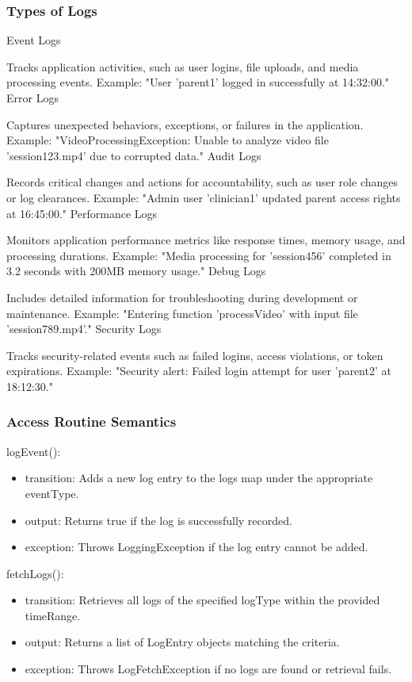 \documentclass[12pt, titlepage]{article}
\begin{document}
\subsubsection{Types of Logs}

Event Logs

Tracks application activities, such as user logins, file uploads, and media processing events.
Example: "User 'parent1' logged in successfully at 14:32:00."
Error Logs

Captures unexpected behaviors, exceptions, or failures in the application.
Example: "VideoProcessingException: Unable to analyze video file 'session123.mp4' due to corrupted data."
Audit Logs

Records critical changes and actions for accountability, such as user role changes or log clearances.
Example: "Admin user 'clinician1' updated parent access rights at 16:45:00."
Performance Logs

Monitors application performance metrics like response times, memory usage, and processing durations.
Example: "Media processing for 'session456' completed in 3.2 seconds with 200MB memory usage."
Debug Logs

Includes detailed information for troubleshooting during development or maintenance.
Example: "Entering function 'processVideo' with input file 'session789.mp4'."
Security Logs

Tracks security-related events such as failed logins, access violations, or token expirations.
Example: "Security alert: Failed login attempt for user 'parent2' at 18:12:30."
\subsubsection{Access Routine Semantics}

\noindent logEvent():
\begin{itemize}
\item transition: Adds a new log entry to the logs map under the appropriate eventType.
\item output: Returns true if the log is successfully recorded.
\item exception: Throws LoggingException if the log entry cannot be added.
\end{itemize}

\noindent fetchLogs():
\begin{itemize}
\item transition: Retrieves all logs of the specified logType within the provided timeRange.
\item output: Returns a list of LogEntry objects matching the criteria.
\item exception: Throws LogFetchException if no logs are found or retrieval fails.
\end{itemize}
\end{document}
